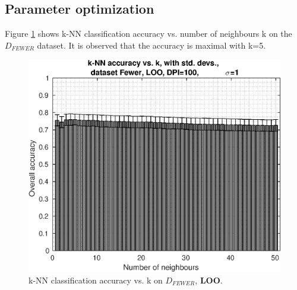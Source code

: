 \subsection{Parameter optimization}
Figure \ref{fig:pca-knn-acc-vs-k} shows k-NN classification
accuracy vs. number of neighbours k on the \(D_{FEWER}\) dataset.
It is observed that the accuracy is maximal with k=5.
\begin{figure}[h]
\centering
\includegraphics[width=\figscale]{img/pca-knn-acc-vs-k-dpi100-sigma1}
\caption{k-NN classification accuracy vs. k on $D_{FEWER}$, \textbf{LOO}.}
\label{fig:pca-knn-acc-vs-k}
\end{figure}